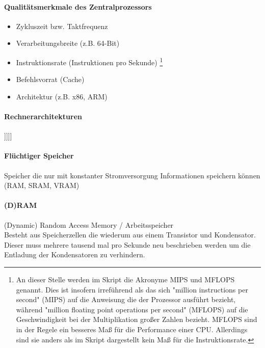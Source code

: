 \documentclass[twocolumn]{article}
\begin{document}
\paragraph{Qualitätsmerkmale des Zentralprozessors}
	\begin{itemize}
		\item Zykluszeit bzw. Taktfrequenz
		\item Verarbeitungsbreite (z.B. 64-Bit)
		\item Instruktionsrate (Instruktionen pro Sekunde) \footnote{An dieser Stelle werden im Skript die Akronyme MIPS und MFLOPS genannt. Dies ist insofern irreführend als das sich "million instructions per second" (MIPS) auf die Anweisung die der Prozessor ausführt bezieht, während "million floating point operations per second" (MFLOPS) auf die Geschwindigkeit bei der Multiplikation großer Zahlen bezieht. MFLOPS sind in der Regele ein besseres Maß für die Performance einer CPU. Allerdings sind sie anders als im Skript dargestellt kein Maß für die Instruktionsrate.}
		\item Befehlsvorrat (Cache)
		\item Architektur (z.B. x86, ARM)
	\end{itemize}

\paragraph{Rechnerarchitekturen \\	}
	\begin{forest} [[Rechnerarchitekturen [von-Neumann\\-Architektur, align=center] [Parallele \\Architektur ,align=center [Pipeline-System] [Multiprozessorsysteme [Asymmetrische Systeme] [Symmetrische Systeme]]]]]
	\end{forest}

\paragraph{Flüchtiger Speicher}
	Speicher die nur mit konstanter Stromversorgung Informationen speichern können (RAM, SRAM, VRAM)

\paragraph{(D)RAM}
	(Dynamic) Random Access Memory / Arbeitsspeicher \\
	Besteht aus Speicherzellen die wiederum aus einem Transistor und Kondensator. Dieser muss mehrere tausend mal pro Sekunde neu beschrieben werden um die Entladung der Kondensatoren zu verhindern.
\end{document}
